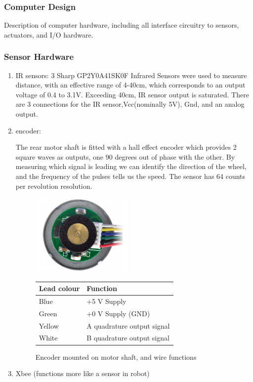 \documentclass[11pt,a4paper]{article}
\begin{document}
    \subsubsection{Computer Design}
    Description of computer hardware, including all interface circuitry to sensors, actuators, and I/O hardware.
    \subsubsection{Sensor Hardware}
      \begin{enumerate}
        \item IR sensors:{ 3 Sharp GP2Y0A41SK0F Infrared Sensors were used to measure distance, with an effective range of 4-40cm, which corresponds to an output voltage of 0.4 to 3.1V. Exceeding 40cm, IR sensor output is saturated. There are 3 connections for the IR sensor,Vcc(nominally 5V), Gnd, and an analog output.}
        \item encoder:{ The rear motor shaft is fitted with a hall effect encoder which provides 2 square waves as outputs, one 90 degrees out of phase with the other. By measuring which signal is leading we can identify the direction of the wheel, and the frequency of the pulses tells us the speed. The sensor has 64 counts per revolution resolution.
        \begin{figure}
          \centering
          \begin{minipage}{0.45\textwidth}
              \centering
              \includegraphics[width = 5cm]{encoder.png}
          \end{minipage}\hfill
          \begin{minipage}{0.45\textwidth}
              \centering
              \begin{tabular}[b]{|l|l|}
                \hline \textbf{Lead colour} & \textbf{Function}\\
                \hline Blue   & +5 V Supply\\
                \hline Green  & +0 V Supply (GND)\\
                \hline Yellow & A quadrature output signal\\
                \hline White  & B quadrature output signal\\
                \hline
              \end{tabular}
          \end{minipage}
          \caption{Encoder mounted on motor shaft, and wire functions}
        \end{figure}
        }
        \item Xbee (functions more like a sensor in robot)
      \end{enumerate}
\end{document}
